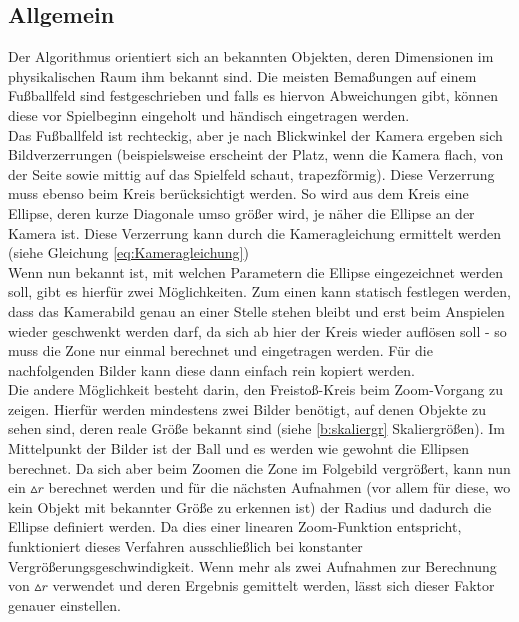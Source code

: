 \documentclass{ezb}
\begin{document}
\subsection{Allgemein}
Der Algorithmus orientiert sich an bekannten Objekten, deren Dimensionen im physikalischen Raum ihm bekannt sind. Die meisten Bemaßungen auf einem Fußballfeld sind festgeschrieben und falls es hiervon Abweichungen gibt, können diese vor Spielbeginn eingeholt und händisch eingetragen werden.\\
\linebreak
Das Fußballfeld ist rechteckig, aber je nach Blickwinkel der Kamera ergeben sich Bildverzerrungen (beispielsweise erscheint der Platz, wenn die Kamera flach, von der Seite sowie mittig auf das Spielfeld schaut, trapezförmig). Diese Verzerrung muss ebenso beim Kreis berücksichtigt werden. So wird aus dem Kreis eine Ellipse, deren kurze Diagonale umso größer wird, je näher die Ellipse an der Kamera ist. Diese Verzerrung kann durch die Kameragleichung ermittelt werden (siehe Gleichung \ref{eq:Kameragleichung})\\
\linebreak
Wenn nun bekannt ist, mit welchen Parametern die Ellipse eingezeichnet werden soll, gibt es hierfür zwei Möglichkeiten. Zum einen kann statisch festlegen werden, dass das Kamerabild genau an einer Stelle stehen bleibt und erst beim Anspielen wieder geschwenkt werden darf, da sich ab hier der Kreis wieder auflösen soll - so muss die Zone nur einmal berechnet und eingetragen werden. Für die nachfolgenden Bilder
kann diese dann einfach rein kopiert werden. \\
\linebreak
{}
Die andere Möglichkeit besteht darin, den Freistoß-Kreis beim Zoom-Vorgang zu zeigen. Hierfür werden mindestens zwei Bilder benötigt, auf denen Objekte zu sehen sind, deren reale Größe bekannt sind (siehe \ref{b:skaliergr} Skaliergrößen). Im Mittelpunkt der Bilder ist der Ball und es werden wie gewohnt die Ellipsen berechnet. Da sich aber beim Zoomen die Zone im Folgebild vergrößert, kann nun ein $\vartriangle r$ berechnet werden und für die nächsten Aufnahmen (vor allem für diese, wo kein Objekt mit bekannter Größe zu erkennen ist) der Radius und dadurch die Ellipse definiert werden. Da dies einer linearen Zoom-Funktion entspricht, funktioniert dieses Verfahren ausschließlich bei konstanter Vergrößerungsgeschwindigkeit. Wenn mehr als zwei Aufnahmen zur Berechnung von $\vartriangle r$ verwendet und deren Ergebnis gemittelt werden, lässt sich dieser Faktor genauer einstellen.
\end{document}
